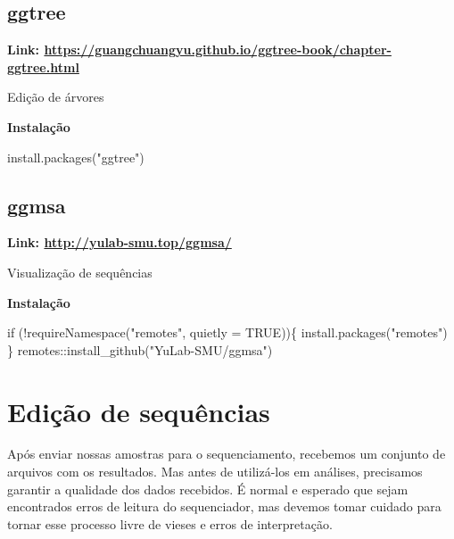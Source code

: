 \documentclass[
  letterpaper,
  DIV=11,
  numbers=noendperiod]{scrreprt}
\newenvironment{Shaded}{\begin{snugshade}}{\end{snugshade}}
\newcommand{\AttributeTok}[1]{\textcolor[rgb]{0.40,0.45,0.13}{#1}}
\newcommand{\ConstantTok}[1]{\textcolor[rgb]{0.56,0.35,0.01}{#1}}
\newcommand{\ControlFlowTok}[1]{\textcolor[rgb]{0.00,0.23,0.31}{#1}}
\newcommand{\FunctionTok}[1]{\textcolor[rgb]{0.28,0.35,0.67}{#1}}
\newcommand{\NormalTok}[1]{\textcolor[rgb]{0.00,0.23,0.31}{#1}}
\newcommand{\SpecialCharTok}[1]{\textcolor[rgb]{0.37,0.37,0.37}{#1}}
\newcommand{\StringTok}[1]{\textcolor[rgb]{0.13,0.47,0.30}{#1}}
\begin{document}
\hypertarget{ggtree}{%
\section{ggtree}\label{ggtree}}

\textbf{Link:
\url{https://guangchuangyu.github.io/ggtree-book/chapter-ggtree.html}}

Edição de árvores

\textbf{Instalação}

\begin{Shaded}
\begin{Highlighting}[]
\FunctionTok{install.packages}\NormalTok{(}\StringTok{"ggtree"}\NormalTok{)}
\end{Highlighting}
\end{Shaded}

\hypertarget{ggmsa}{%
\section{ggmsa}\label{ggmsa}}

\textbf{Link: \url{http://yulab-smu.top/ggmsa/}}

Visualização de sequências

\textbf{Instalação}

\begin{Shaded}
\begin{Highlighting}[]
\ControlFlowTok{if}\NormalTok{ (}\SpecialCharTok{!}\FunctionTok{requireNamespace}\NormalTok{(}\StringTok{"remotes"}\NormalTok{, }\AttributeTok{quietly =} \ConstantTok{TRUE}\NormalTok{))\{}
    \FunctionTok{install.packages}\NormalTok{(}\StringTok{"remotes"}\NormalTok{)}
\NormalTok{  \}}
\NormalTok{remotes}\SpecialCharTok{::}\FunctionTok{install\_github}\NormalTok{(}\StringTok{"YuLab{-}SMU/ggmsa"}\NormalTok{)}
\end{Highlighting}
\end{Shaded}

\hypertarget{ediuxe7uxe3o-de-sequuxeancias}{%
\chapter{Edição de sequências}\label{ediuxe7uxe3o-de-sequuxeancias}}

Após enviar nossas amostras para o sequenciamento, recebemos um conjunto
de arquivos com os resultados. Mas antes de utilizá-los em análises,
precisamos garantir a qualidade dos dados recebidos. É normal e esperado
que sejam encontrados erros de leitura do sequenciador, mas devemos
tomar cuidado para tornar esse processo livre de vieses e erros de
interpretação.
\end{document}
